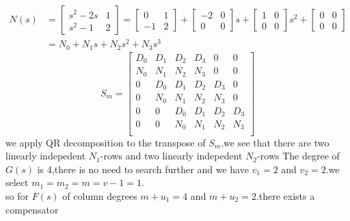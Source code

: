 \documentclass{article}
\begin{document}
\[
\begin{split}
N(s)& =\left[
    \begin{array}{cc}
        s^2-2s & 1\\
        s^2-1 & 2
    \end{array}
\right]=
\left[
    \begin{array}{cc}
        0 & 1\\
        -1 & 2
    \end{array}
\right]+
\left[
    \begin{array}{cc}
        -2 & 0\\
        0 & 0
    \end{array}
\right]s+
\left[
    \begin{array}{cc}
        1 & 0\\
        0 & 0
    \end{array}
\right]s^2+
\left[
    \begin{array}{cc}
        0 & 0\\
        0 & 0
    \end{array}
\right]
\\
& =N_0+N_1s+N_2s^2+N_3s^3
\end{split}
\]
\[
S_m=
    \left[ 
        \begin{array}{cccccc}
            D_0 & D_1 & D_2 & D_3 & 0 & 0\\
            N_0 & N_1 & N_2 & N_3 & 0& 0\\
            0 & D_0 & D_1 & D_2 & D_3 & 0\\
            0 & N_0 & N_1 & N_2 & N_3 & 0\\
            0 & 0 & D_0 & D_1 & D_2 & D_3\\
            0 & 0 & N_0 & N_1 & N_2 & N_3 \\
        \end{array}
    \right]    
\]
we apply QR decomposition to the transpose of $S_m$,we see that there are two linearly indepedent $N_1$-rows and two linearly indepedent $N_2$-rows
The degree of $G(s)$ is 4,there is no need to search further and we have $v_1=2$ and $v_2=2$.we select $m_1=m_2=m=v-1=1$.\\
so for $F(s)$ of column degrees $m+u_1=4$ and $m+u_2=2$.there exists a compensator
\end{document}
